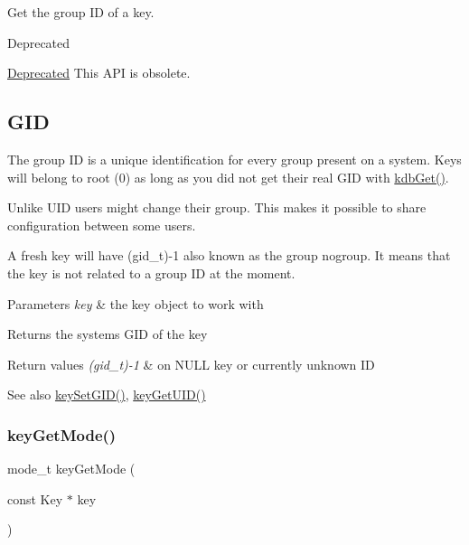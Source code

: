 Get the group ID of a key. 

\begin{DoxyRefDesc}{Deprecated}
\item[\hyperlink{deprecated__deprecated000016}{Deprecated}]This A\+PI is obsolete.\end{DoxyRefDesc}
\hypertarget{group__meta_GID}{}\subsection{G\+ID}\label{group__meta_GID}
The group ID is a unique identification for every group present on a system. Keys will belong to root (0) as long as you did not get their real G\+ID with \hyperlink{group__kdb_ga28e385fd9cb7ccfe0b2f1ed2f62453a1}{kdb\+Get()}.

Unlike U\+ID users might change their group. This makes it possible to share configuration between some users.

A fresh key will have (gid\+\_\+t)-\/1 also known as the group nogroup. It means that the key is not related to a group ID at the moment.


\begin{DoxyParams}{Parameters}
{\em key} & the key object to work with \\
\hline
\end{DoxyParams}
\begin{DoxyReturn}{Returns}
the system\textquotesingle{}s G\+ID of the key 
\end{DoxyReturn}

\begin{DoxyRetVals}{Return values}
{\em (gid\+\_\+t)-\/1} & on N\+U\+LL key or currently unknown ID \\
\hline
\end{DoxyRetVals}
\begin{DoxySeeAlso}{See also}
\hyperlink{group__meta_ga9e3d0fb3f7ba906e067727b9155d22e3}{key\+Set\+G\+I\+D()}, \hyperlink{group__meta_gacaa5060e67b03f50ae49a3620c54bc46}{key\+Get\+U\+I\+D()} 
\end{DoxySeeAlso}
\mbox{\label{group__meta_gabc0cec592ce3b77e9bc33dbc8e8f6bdc}} 
\subsubsection{\texorpdfstring{key\+Get\+Mode()}{keyGetMode()}}
{\footnotesize\ttfamily mode\+\_\+t key\+Get\+Mode (\begin{DoxyParamCaption}\item[{const Key $\ast$}]{key }\end{DoxyParamCaption})}



